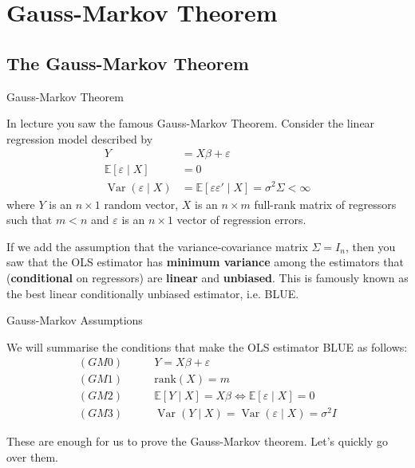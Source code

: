 \section{Gauss-Markov Theorem}

\subsection{The Gauss-Markov Theorem}

\begin{frame}{Gauss-Markov Theorem}

    In lecture you saw the famous Gauss-Markov Theorem. Consider the linear regression model described by
    \begin{align*}
        Y &= X \beta + \varepsilon
        \\
        \mathbb{E}[\varepsilon \mid X] &= 0
        \\
        \operatorname{Var}(\varepsilon \mid X) &= \mathbb{E}[\varepsilon \varepsilon' \mid X] = \sigma^2 \Sigma < \infty
    \end{align*}
    where $Y$ is an $n \times 1$ random vector, $X$ is an $n \times m$ full-rank matrix of regressors such that $m < n$ and $\varepsilon$ is an $n \times 1$ vector of regression errors.

    \vspace{2em}

    If we add the assumption that the variance-covariance matrix $\Sigma = I_n$, then you saw that the OLS estimator has \textbf{minimum variance} among the estimators that (\textbf{conditional} on regressors) are \textbf{linear} and \textbf{unbiased}. This is famously known as the best linear conditionally unbiased estimator, i.e. BLUE.

\end{frame}

\begin{frame}{Gauss-Markov Assumptions}

    We will summarise the conditions that make the OLS estimator BLUE as follows:
    \begin{align*}
        (GM0)& \qquad Y = X \beta + \varepsilon
        \\
        (GM1)& \qquad \text{rank}(X) = m 
        \\
        (GM2)& \qquad \mathbb{E}[Y \mid X] = X \beta \iff \mathbb{E}[\varepsilon \mid X] = 0
        \\
        (GM3)& \qquad \operatorname{Var}(Y \mid X) = \operatorname{Var}(\varepsilon \mid X) = \sigma^2 I 
    \end{align*}

    These are enough for us to prove the Gauss-Markov theorem. Let's quickly go over them.

\end{frame}

